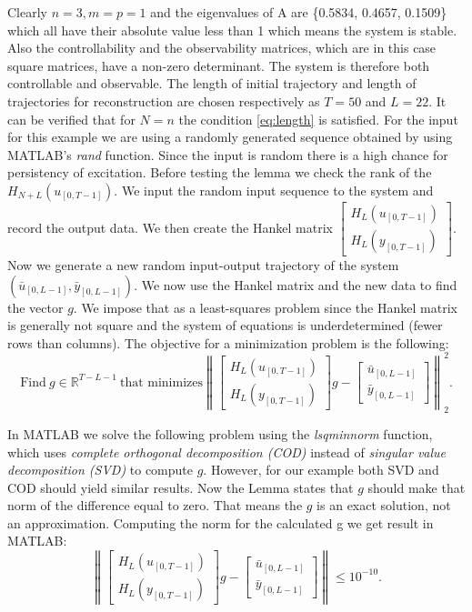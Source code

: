 \documentclass[12pt,a4paper]{report}
\newcommand{\norm}[1]{\left\lVert #1 \right\rVert}
\begin{document}
Clearly \(n=3, m=p=1\) and the eigenvalues of A are \{0.5834, 0.4657, 0.1509\} which all have their absolute value less than 1 which means the system is stable. Also
the controllability and the observability matrices, which are in this case square matrices, have a non-zero determinant. The system is therefore both controllable and observable.
The length of initial trajectory and length of trajectories for reconstruction are chosen respectively as $T = 50$ and $L = 22$. It can be verified that for $N=n$ the condition \eqref{eq:length} is satisfied.
For the input for this example we are using a randomly generated sequence obtained by using MATLAB's \textit{rand} function. Since the input is random there is a high chance for persistency of excitation. Before
testing the lemma we check the rank of the $H_{N+L}(u_{[0, T-1]})$. We input the random input sequence to the system and record the output data. We then create the Hankel matrix $\begin{bmatrix} H_{L}(u_{[0, T-1]}) \\ H_{L}(y_{[0, T-1]})\end{bmatrix}$.
Now we generate a new random input-output trajectory of the system \((\bar{u}_{[0, L-1]}, \bar{y}_{[0, L-1]})\). We now use the Hankel matrix and the new data to find the vector $g$. We impose that
as a least-squares problem since the Hankel matrix is generally not square and the system of equations is underdetermined (fewer rows than columns). The objective for a minimization problem is the following:
\begin{equation}
    \mbox{Find} \ g\in\mathbb{R}^{T-L-1} \ \mbox{that minimizes} \norm{\begin{bmatrix} H_{L}(u_{[0, T-1]}) \\ H_{L}(y_{[0, T-1]})\end{bmatrix}g - \begin{bmatrix} \bar{u}_{[0, L-1]} \\ \bar{y}_{[0, L-1]} \end{bmatrix}}_{2}^{2}.
    \label{eq:gmin}
\end{equation}

In MATLAB we solve the following problem using the \textit{lsqminnorm} function, which uses \textit{complete orthogonal decomposition (COD)} instead of \textit{singular value decomposition (SVD)} to compute $g$. However, for our example
both SVD and COD should yield similar results. Now the Lemma states that $g$ should make that norm of the difference equal to zero. That means the $g$ is an exact solution, not an approximation. Computing the norm for the calculated g we
get result in MATLAB:
\begin{equation}
\norm{\begin{bmatrix} H_{L}(u_{[0, T-1]}) \\ H_{L}(y_{[0, T-1]})\end{bmatrix}g - \begin{bmatrix} \bar{u}_{[0, L-1]} \\ \bar{y}_{[0, L-1]} \end{bmatrix}} \leq 10^{-10}.
\label{eq:norm}
\end{equation}
\end{document}
